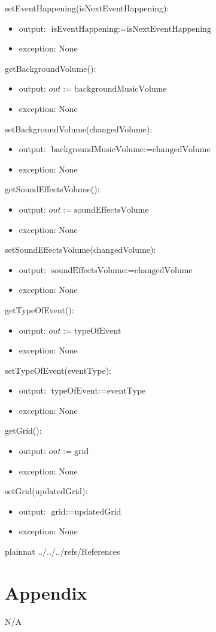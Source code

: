 \documentclass[12pt, titlepage]{article}
\begin{document}
\noindent setEventHappening(isNextEventHappening):
\begin{itemize}
\item output: $\text{isEventHappening} := \text{isNextEventHappening}$
\item exception: None
\end{itemize}

\noindent getBackgroundVolume():
\begin{itemize}
\item output: $out := \text{backgroundMusicVolume}$
\item exception: None
\end{itemize}

\noindent setBackgroundVolume(changedVolume):
\begin{itemize}
\item output: $\text{backgroundMusicVolume} := \text{changedVolume}$
\item exception: None
\end{itemize}

\noindent getSoundEffectsVolume():
\begin{itemize}
\item output: $out := \text{soundEffectsVolume}$
\item exception: None
\end{itemize}

\noindent setSoundEffectsVolume(changedVolume):
\begin{itemize}
\item output: $\text{soundEffectsVolume} := \text{changedVolume}$
\item exception: None
\end{itemize}


\noindent getTypeOfEvent():
\begin{itemize}
\item output: $out := \text{typeOfEvent}$
\item exception: None
\end{itemize}

\noindent setTypeOfEvent(eventType):
\begin{itemize}
\item output: $\text{typeOfEvent} := \text{eventType}$
\item exception: None
\end{itemize}

\noindent getGrid():
\begin{itemize}
\item output: $out := \text{grid}$
\item exception: None
\end{itemize}

\noindent setGrid(updatedGrid):
\begin{itemize}
\item output: $\text{grid} := \text{updatedGrid}$
\item exception: None
\end{itemize}


\medskip

\newpage

 {plainnat}
 {../../../refs/References}

\newpage

\section{Appendix} \label{Appendix}
N/A
\end{document}
